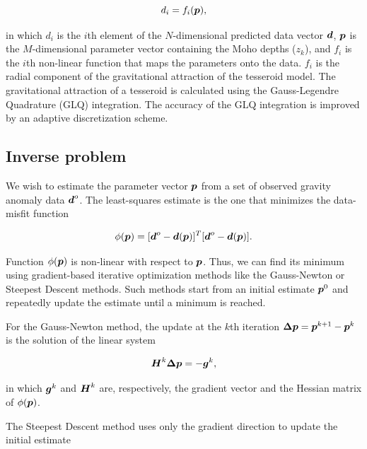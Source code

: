 \documentclass[extra,mreferee]{gji}
\newcommand{\mbf}[1]{\hbox{\mathversion{bold}$#1$}}
\begin{document}
\begin{equation}
    d_i = f_i(\mbf{p}),
\end{equation}

\noindent in which $d_i$ is the $i$th element of the $N$-dimensional predicted
data vector $\mbf{d}$, $\mbf{p}$ is the $M$-dimensional parameter vector
containing the Moho depths ($z_k$),
and $f_i$ is the $i$th non-linear function that maps the parameters onto the
data.
$f_i$ is the radial component of the gravitational attraction of the tesseroid
model.
The gravitational attraction of a tesseroid is calculated using the
Gauss-Legendre Quadrature (GLQ) integration.
The accuracy of the GLQ integration is improved by an adaptive discretization
scheme.


\subsection{Inverse problem}

We wish to estimate the parameter vector $\mbf{p}$ from a set of observed
gravity anomaly data $\mbf{d}^o$.
The least-squares estimate is the one that minimizes the data-misfit function

\begin{equation}
    \phi(\mbf{p}) =
    [\mbf{d}^o - \mbf{d}(\mbf{p})]^T[\mbf{d}^o - \mbf{d}(\mbf{p})].
    \label{eq:data-misfit}
\end{equation}

Function $\phi(\mbf{p})$ is non-linear with respect to $\mbf{p}$.
Thus, we can find its minimum using gradient-based
iterative optimization
methods like the Gauss-Newton or Steepest Descent methods.
Such methods start from an initial estimate $\mbf{p}^0$ and repeatedly update
the estimate until a minimum is reached.

For the Gauss-Newton method,
the update at the $k$th iteration $\mbf{\Delta p} = \mbf{p}^{k+1} - \mbf{p}^k$
is the solution of the linear system

\begin{equation}
    \mbf{H}^k\mbf{\Delta p} = -\mbf{g}^k,
    \label{eq:gaussnewton}
\end{equation}

\noindent in which
$\mbf{g}^k$ and $\mbf{H}^k$ are, respectively,
the gradient vector and the Hessian matrix of $\phi(\mbf{p})$.

The Steepest Descent method uses only the gradient direction
to update the initial estimate
\end{document}
